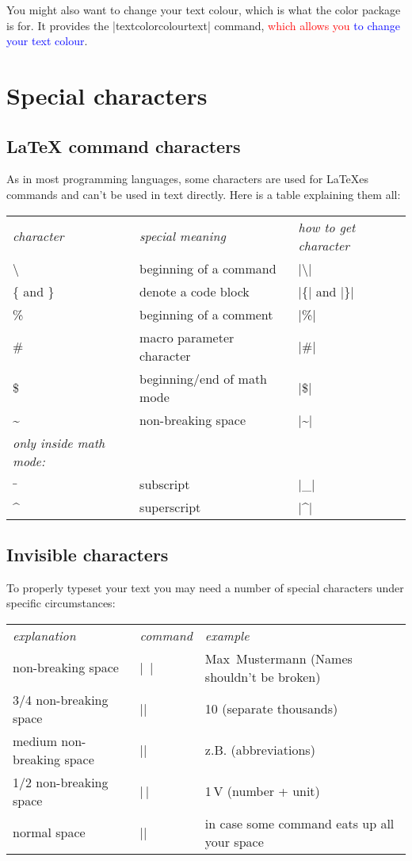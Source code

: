 		\medskip
		You might also want to change your text colour, which is what the {color} package is for. It provides the
		|textcolor{colour}{text}| command, \textcolor{red}{which allows you} \textcolor{blue}{to change your text colour}.

		\section{Special characters} \label{sec: special-charaters}
			\subsection{LaTeX command characters}
				As in most programming languages, some characters are used for LaTeXes commands and can't be used in text directly. Here is a table
				explaining them all:

				\smallskip
				\begin{tabular}{l l l}
					\emph{character} & \emph{special meaning} & \emph{how to get character} \\
					\textbackslash & beginning of a command & |\textbackslash| \\
					\{ and \} & denote a code block & |\{| and |\}|\\
					\% & beginning of a comment & |\%| \\
					\# & macro parameter character & |\#| \\
					\$ & beginning/end of math mode & |\$| \\
					\textasciitilde & non-breaking space & |\textasciitilde| \\
					\emph{only inside math mode:} \\
					$\_$ & subscript & |\_| \\
					\textasciicircum & superscript & |\textasciicircum| \\
				\end{tabular}

			\subsection{Invisible characters}
				To properly typeset your text you may need a number of special characters under specific circumstances:

				\smallskip
				\begin{tabular}{l l l}
					\emph{explanation} & \emph{command} & \emph{example} \\
					non-breaking space & |~| & Max~Mustermann (Names shouldn't be broken) \\
					3/4 non-breaking space & |\;| & 10\;000 (separate thousands)\\
					medium non-breaking space & |\:| & z.\:B. (abbreviations) \\
					1/2 non-breaking space & |\,| & 1\,V (number + unit) \\
					normal space & |\space| & in case some command eats up all your space \\
				\end{tabular}
